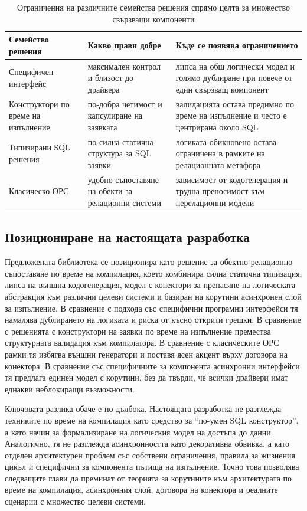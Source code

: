 \begin{table}[H]
\centering
\caption{Ограничения на различните семейства решения спрямо целта за множество свързващи компоненти}
\label{tab:existing_solution_limitations}
\begin{tabularx}{\textwidth}{L{3.2cm}L{3.3cm}Y}
\toprule
\textbf{Семейство решения} & \textbf{Какво прави добре} & \textbf{Къде се появява ограничението} \\
\midrule
Специфичен интерфейс & максимален контрол и близост до драйвера & липса на общ логически модел и голямо дублиране при повече от един свързващ компонент \\
Конструктори по време на изпълнение & по-добра четимост и капсулиране на заявката & валидацията остава предимно по време на изпълнение и често е центрирана около SQL \\
Типизирани SQL решения & по-силна статична структура за SQL заявки & логиката обикновено остава ограничена в рамките на релационната метафора \\
Класическо ОРС & удобно съпоставяне на обекти за релационни системи & зависимост от кодогенерация и трудна преносимост към нерелационни модели \\
\bottomrule
\end{tabularx}
\end{table}

\subsection{Позициониране на настоящата разработка}

Предложената библиотека се позиционира като решение за обектно-релационно съпоставяне по време на компилация, което комбинира силна статична типизация, липса на външна кодогенерация, модел с конектори за пренасяне на логическата абстракция към различни целеви системи и базиран на корутини асинхронен слой за изпълнение. В сравнение с подхода със специфични програмни интерфейси тя намалява дублирането на логиката и риска от късно открити грешки. В сравнение с решенията с конструктори на заявки по време на изпълнение премества структурната валидация към компилатора. В сравнение с класическите ОРС рамки тя избягва външни генератори и поставя ясен акцент върху договора на конектора. В сравнение със специфичните за компонента асинхронни интерфейси тя предлага единен модел с корутини, без да твърди, че всички драйвери имат еднакви неблокиращи възможности.

Ключовата разлика обаче е по-дълбока. Настоящата разработка не разглежда техниките по време на компилация като средство за ``по-умен SQL конструктор'', а като начин за формализиране на логическия модел на достъпа до данни. Аналогично, тя не разглежда асинхронността като декоративна обвивка, а като отделен архитектурен проблем със собствени ограничения, правила за жизнения цикъл и специфични за компонента пътища на изпълнение. Точно това позволява следващите глави да преминат от теорията за корутините към архитектурата по време на компилация, асинхронния слой, договора на конектора и реалните сценарии с множество целеви системи.

